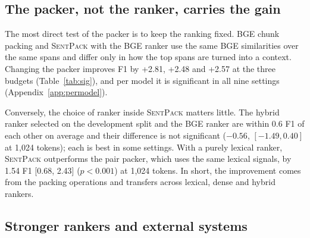 \documentclass[11pt]{article}
\newcommand{\spk}{\textsc{SentPack}}
\begin{document}
\subsection{The packer, not the ranker, carries the gain}
\label{sec:agnostic}
The most direct test of the packer is to keep the ranking fixed. BGE chunk packing and \spk{} with the BGE ranker use the same BGE similarities over the same spans and differ only in how the top spans are turned into a context. Changing the packer improves F1 by +2.81, +2.48 and +2.57 at the three budgets (Table~\ref{tab:sig}), and per model it is significant in all nine settings (Appendix~\ref{app:permodel}).

Conversely, the choice of ranker inside \spk{} matters little. The hybrid ranker selected on the development split and the BGE ranker are within 0.6 F1 of each other on average and their difference is not significant ($-0.56$, $[-1.49, 0.40]$ at 1,024 tokens); each is best in some settings. With a purely lexical ranker, \spk{} outperforms the pair packer, which uses the same lexical signals, by 1.54 F1 [0.68, 2.43] ($p<0.001$) at 1,024 tokens. In short, the improvement comes from the packing operations and transfers across lexical, dense and hybrid rankers.

\subsection{Stronger rankers and external systems}
\label{sec:external}
\end{document}
